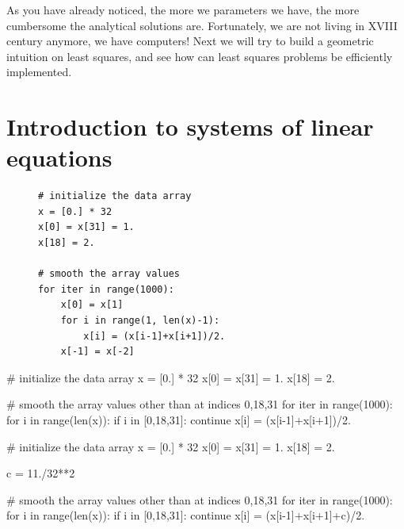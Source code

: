 \documentclass[notitlepage]{report}
\begin{document}
As you have already noticed, the more we parameters we have, the more cumbersome the analytical solutions are.
Fortunately, we are not living in XVIII century anymore, we have computers!
Next we will try to build a geometric intuition on least squares, and see how can least squares problems be efficiently implemented.


\chapter{Introduction to systems of linear equations}

\begin{figure}[h!tb]
\begin{verbatim}
# initialize the data array
x = [0.] * 32
x[0] = x[31] = 1.
x[18] = 2.

# smooth the array values
for iter in range(1000):
    x[0] = x[1]
    for i in range(1, len(x)-1):
        x[i] = (x[i-1]+x[i+1])/2.
    x[-1] = x[-2]
\end{verbatim}
\end{figure}


\iffalse
\begin{python}
# initialize the data array
x = [0.] * 32
x[0] = x[31] = 1.
x[18] = 2.

# smooth the array values other than at indices 0,18,31
for iter in range(1000):
    for i in range(len(x)):
        if i in [0,18,31]: continue
        x[i] = (x[i-1]+x[i+1])/2.
\end{python}


\begin{python}
# initialize the data array
x = [0.] * 32
x[0] = x[31] = 1.
x[18] = 2.

c = 11./32**2

# smooth the array values other than at indices 0,18,31
for iter in range(1000):
    for i in range(len(x)):
        if i in [0,18,31]: continue
        x[i] = (x[i-1]+x[i+1]+c)/2.

\end{python}
\end{document}

